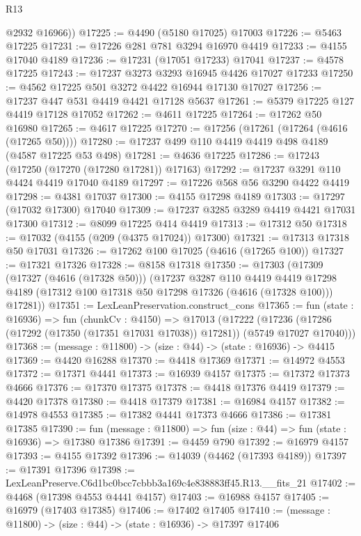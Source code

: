\begin{lexlean}{R13}
\begin{coremodule}
        @2932
        @16966))
@17225 := @4490 (@5180 @17025) @17003
@17226 := @5463 @17225
@17231 := @17226 @281 @781 @3294 @16970 @4419
@17233 := @4155 @17040 @4189
@17236 := @17231 (@17051 @17233) @17041
@17237 := @4578 @17225
@17243 := @17237 @3273 @3293 @16945 @4426 @17027 @17233
@17250 := @4562 @17225 @501 @3272 @4422 @16944 @17130 @17027
@17256 := @17237 @447 @531 @4419 @4421 @17128 @5637
@17261 := @5379 @17225 @127 @4419 @17128 @17052
@17262 := @4611 @17225
@17264 := @17262 @50 @16980
@17265 := @4617 @17225
@17270 := @17256 (@17261 (@17264 (@4616 (@17265 @50))))
@17280 := @17237 @499 @110 @4419 @4419 @498 @4189 (@4587 @17225 @53 @498)
@17281 := @4636 @17225
@17286 := @17243 (@17250 (@17270 (@17280 @17281)) @17163)
@17292 := @17237 @3291 @110 @4424 @4419 @17040 @4189
@17297 := @17226 @568 @56 @3290 @4422 @4419
@17298 := @4381 @17037
@17300 := @4155 @17298 @4189
@17303 := @17297 (@17032 @17300) @17040
@17309 := @17237 @3285 @3289 @4419 @4421 @17031 @17300
@17312 := @8099 @17225 @414 @4419
@17313 := @17312 @50
@17318 := @17032 (@4155 (@209 (@4375 @17024)) @17300)
@17321 := @17313 @17318 @50 @17031
@17326 := @17262 @100 @17025 (@4616 (@17265 @100))
@17327 := @17321 @17326
@17328 := @8158 @17318
@17350 := @17303
    (@17309
      (@17327 (@4616 (@17328 @50)))
      (@17237
        @3287
        @110
        @4419
        @4419
        @17298
        @4189
        (@17312 @100 @17318 @50 @17298 @17326 (@4616 (@17328 @100)))
        @17281))
@17351 := LexLeanPreservation.construct_cons
@17365 := fun (state : @16936) =>
  fun (chunkCv : @4150) =>
  @17013
    (@17222 (@17236 (@17286 (@17292 (@17350 (@17351 @17031 @17038)) @17281)) (@5749 @17027 @17040)))
@17368 := (message : @11800) -> (size : @44) -> (state : @16936) -> @4415
@17369 := @4420 @16288
@17370 := @4418 @17369
@17371 := @14972 @4553
@17372 := @17371 @4441
@17373 := @16939 @4157
@17375 := @17372 @17373 @4666
@17376 := @17370 @17375
@17378 := @4418 @17376 @4419
@17379 := @4420 @17378
@17380 := @4418 @17379
@17381 := @16984 @4157
@17382 := @14978 @4553
@17385 := @17382 @4441 @17373 @4666
@17386 := @17381 @17385
@17390 := fun (message : @11800) => fun (size : @44) => fun (state : @16936) => @17380 @17386
@17391 := @4459 @790
@17392 := @16979 @4157
@17393 := @4155 @17392
@17396 := @14039 (@4462 (@17393 @4189))
@17397 := @17391 @17396
@17398 := LexLeanPreserve.C6d1bc0bcc7cbbb3a169c4e838883ff45.R13.__fits_21
@17402 := @4468 (@17398 @4553 @4441 @4157)
@17403 := @16988 @4157
@17405 := @16979 (@17403 @17385)
@17406 := @17402 @17405
@17410 := (message : @11800) -> (size : @44) -> (state : @16936) -> @17397 @17406

\end{coremodule}
\end{lexlean}

